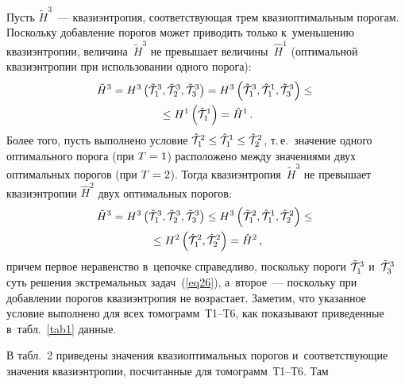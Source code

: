 \begin{multicols}{2}
Пусть $\tilde{H}^3$~--- квазиэнтропия, соответствующая трем квазиоптимальным порогам. 
Поскольку до\-бав\-ле\-ние порогов может приводить только к~уменьшению квазиэнтропии, 
величина~$\tilde{H}^3$ не превышает величины~$\hat{H}^1$ (оптимальной квазиэнтропии 
при использовании одного порога):
\begin{multline*}
\tilde{H}^3 =
H^3\left({\tilde{\cal T}}^{3}_{1}, {\tilde{\cal T}}^{3}_{2}, 
{\tilde{\cal T}}^{3}_{3}\right) =
H^3\left({\tilde{\cal T}}^{3}_{1}, {\hat{\cal T}}^{1}_{1},
 {\tilde{\cal T}}^{3}_{3}\right) \leq{}\\
 {}\leq
H^1\left({\hat{\cal T}}^{1}_{1}\right) =
\hat{H}^1\,.
\end{multline*}
Более того, пусть выполнено условие ${\hat{\cal T}}^{2}_{1}\hm\leq 
{\hat{\cal T}}^{1}_{1}\hm\leq {\hat{\cal T}}^{2}_{2}$, т.\,е.\ значение 
одного оптимального порога (при $T\hm=1$) расположено между значениями двух 
оптимальных порогов (при $T\hm=2$). Тогда квазиэнтропия~$\tilde{H}^3$ не 
превышает квазиэнтропии $\hat{H}^2$ двух оптимальных порогов:
\begin{multline*}
\tilde{H}^3 =
H^3\left({\tilde{\cal T}}^{3}_{1}, {\tilde{\cal T}}^{3}_{2}, {\tilde{\cal T}}^{3}_{3}\right)\leq
H^3\left({\tilde{\cal T}}^{2}_{1}, {\hat{\cal T}}^{1}_{1}, 
{\tilde{\cal T}}^{2}_{2}\right) \leq{}\\
{}\leq
H^2\left({\hat{\cal T}}^{2}_{1},{\hat{\cal T}}^{2}_{2}\right) =
\hat{H}^2\,,
\end{multline*}
причем первое неравенство в~цепочке справедливо, поскольку 
пороги ${\tilde{\cal T}}^{3}_{1}$ и~${\tilde{\cal T}}^{3}_{3}$ суть 
решения экстремальных задач~(\ref{eq26}), а~второе~--- 
поскольку при до\-бав\-ле\-нии порогов квазиэнтропия не возрастает. Заметим, 
что указанное условие выполнено для всех томограмм~Т1--Т6, как показывают 
приведенные в~табл.~\ref{tab1} данные.

В табл.~2 приведены значения квазиоптимальных порогов и~соответствующие 
значения квазиэнтропии, посчитанные для томограмм~Т1--Т6. Там\linebreak\vspace*{-12pt} 



\begin{figure*}[b] %
\vspace*{1pt}
\begin{center}
\mbox{%
\epsfxsize=161.036mm
}
\end{center}
\vspace*{-9pt}
\label{fig3}
\end{figure*}



\end{multicols}

